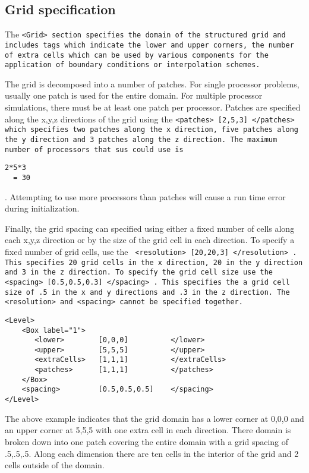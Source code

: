 %
\subsection{Grid specification} \label{Sec:Grid}

The \tt <Grid> \normalfont section specifies the domain of the
structured grid and includes tags which indicate the lower and upper
corners, the number of extra cells which can be used by various
components for the application of boundary conditions or interpolation
schemes.  

The grid is decomposed into a number of patches.  For single processor
problems, usually one patch is used for the entire domain.  For
multiple processor simulations, there must be at least one patch per
processor.  Patches are specified along the x,y,z directions of the
grid using the \tt <patches> [2,5,3] </patches> \normalfont which
specifies two patches along the x direction, five patches along the y
direction and 3 patches along the z direction.  The maximum number of
processors that \tt sus \normalfont could use is \begin{verbatim}2*5*3
  = 30 \end{verbatim}.  Attempting to use more processors than patches
will cause a run time error during initialization.

Finally, the grid spacing can specified using either a fixed number of
cells along each x,y,z direction or by the size of the grid cell in
each direction.  To specify a fixed number of grid cells, use the \tt
<resolution> [20,20,3] </resolution> \normalfont.  This specifies 20
grid cells in the x direction, 20 in the y direction and 3 in the z
direction.  To specify the grid cell size use the \tt <spacing>
[0.5,0.5,0.3] </spacing> \normalfont.  This specifies the a grid cell
size of .5 in the x and y directions and .3 in the z direction.  The
\tt <resolution> \normalfont and \tt <spacing> \normalfont cannot be
specified together.

\begin{Verbatim}[fontsize=\footnotesize]
<Level>
    <Box label="1">
       <lower>        [0,0,0]          </lower>
       <upper>        [5,5,5]          </upper>
       <extraCells>   [1,1,1]          </extraCells>
       <patches>      [1,1,1]          </patches>
    </Box>
    <spacing>         [0.5,0.5,0.5]    </spacing>
</Level>
\end{Verbatim}

The above example indicates that the grid domain has a lower corner at
0,0,0 and an upper corner at 5,5,5 with one extra cell in each
direction.  There domain is broken down into one patch covering the
entire domain with a grid spacing of .5,.5,.5.  Along each dimension
there are ten cells in the interior of the grid and 2 cells outside of
the domain.


